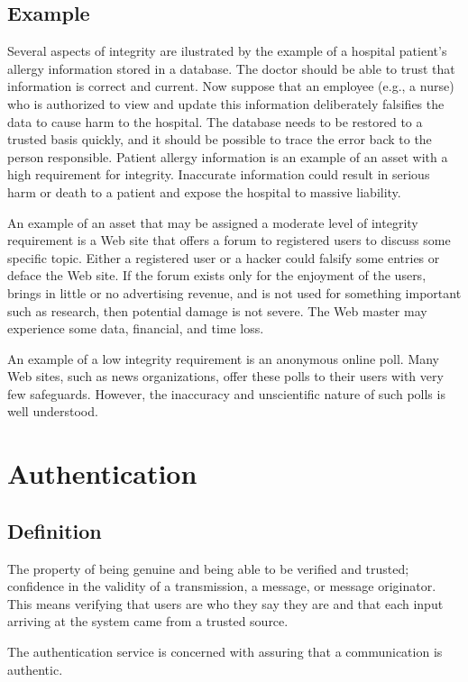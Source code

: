 \documentclass[12pt]{article}
\begin{document}
    	\subsection{Example}
    		Several aspects of integrity are ilustrated by the example of a hospital patient's allergy information stored in a database. The doctor should be able to trust that information is correct and current. Now suppose that an employee (e.g., a nurse) who is authorized to view and update this information deliberately falsifies the data to cause harm to the hospital. The database needs to be restored to a trusted basis quickly, and it should be possible to trace the error back to the person responsible. Patient allergy information is an example of an asset with a high requirement for integrity. Inaccurate information could result in serious harm or death to a patient and expose the hospital to massive liability.

    		An example of an asset that may be assigned a moderate level of integrity requirement is a Web site that offers a forum to registered users to discuss some specific topic. Either a registered user or a hacker could falsify some entries or deface the Web site. If the forum exists only for the enjoyment of the users, brings in little or no advertising revenue, and is not used for something important such as research, then potential damage is not severe. The Web master may experience some data, financial, and time loss.

    		An example of a low integrity requirement is an anonymous online poll. Many Web sites, such as news organizations, offer these polls to their users with very few safeguards. However, the inaccuracy and unscientific nature of such polls is well understood.

    \section{Authentication}
    	\subsection{Definition}
    		The property of being genuine and being able to be verified and trusted; confidence in the validity of a transmission, a message, or message originator. This means verifying that users are who they say they are and that each input arriving at the system came from a trusted source.

    		The authentication service is concerned with assuring that a communication is authentic. 
\end{document}
